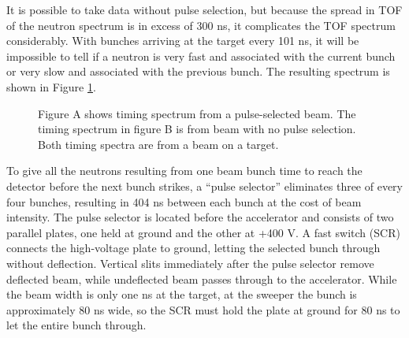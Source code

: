 
It is possible to take data without pulse selection, but because the spread in TOF of the neutron spectrum is in excess of 300 ns, it complicates the TOF spectrum considerably.  With bunches arriving at the target every 101 ns, it will be impossible to tell if a neutron is very fast and associated with the current bunch or very slow and associated with the previous bunch.  The resulting spectrum is shown in Figure \ref{fig:PSvsNPS_TOF}.

\begin{figure}[htp]
\centering
{}
\label{fig:PSvsNPS_TOF}
\caption{Figure A shows timing spectrum from a pulse-selected beam.  The timing spectrum in figure B is from beam with no pulse selection.  Both timing spectra are from a  beam on a  target.}
\end{figure}

To give all the neutrons resulting from one beam bunch time to reach the detector before the next bunch strikes, a ``pulse selector'' eliminates three of every four bunches, resulting in 404 ns between each bunch at the cost of beam intensity.  The pulse selector is located before the accelerator and consists of two parallel plates, one held at ground and the other at +400 V.  A fast switch (SCR) connects the high-voltage plate to ground, letting the selected bunch through without deflection.  Vertical slits immediately after the pulse selector remove deflected beam, while undeflected beam passes through to the accelerator.  While the beam width is only one ns at the target, at the sweeper the bunch is approximately 80 ns wide, so the SCR must hold the plate at ground for 80 ns to let the entire bunch through.

